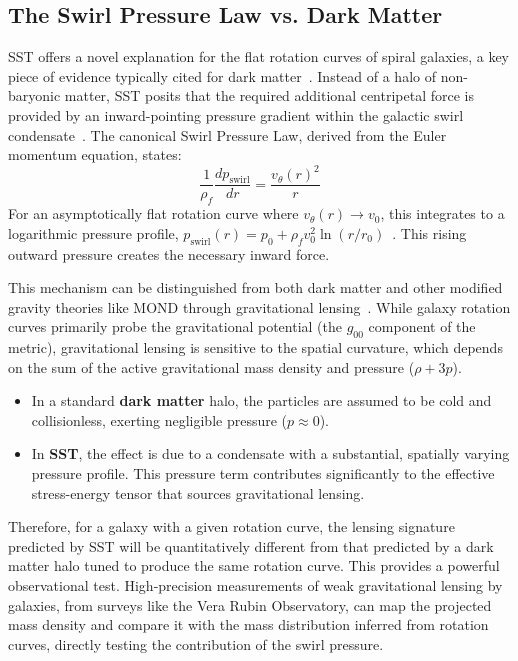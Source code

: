 \documentclass[11pt, a4paper]{article}
\begin{document}
    \subsection{The Swirl Pressure Law vs. Dark Matter}

        SST offers a novel explanation for the flat rotation curves of spiral galaxies, a key piece of evidence typically cited for dark matter~\cite{rotation_curve1, rotation_curve2}. Instead of a halo of non-baryonic matter, SST posits that the required additional centripetal force is provided by an inward-pointing pressure gradient within the galactic swirl condensate~\cite{sst_canon}. The canonical Swirl Pressure Law, derived from the Euler momentum equation, states:
        \begin{equation}
        \frac{1}{\rho_f}\frac{dp_{\text{swirl}}}{dr} = \frac{v_{\theta}(r)^2}{r}
        \end{equation}
        For an asymptotically flat rotation curve where $v_{\theta}(r) \to v_0$, this integrates to a logarithmic pressure profile, $p_{\text{swirl}}(r) = p_0 + \rho_f v_0^2 \ln(r/r_0)$~\cite{sst_canon}. This rising outward pressure creates the necessary inward force.

        This mechanism can be distinguished from both dark matter and other modified gravity theories like MOND through gravitational lensing~\cite{lensing_mond}. While galaxy rotation curves primarily probe the gravitational potential (the $g_{00}$ component of the metric), gravitational lensing is sensitive to the spatial curvature, which depends on the sum of the active gravitational mass density and pressure ($\rho + 3p$).
        \begin{itemize}
        \item In a standard \textbf{dark matter} halo, the particles are assumed to be cold and collisionless, exerting negligible pressure ($p \approx 0$).
        \item In \textbf{SST}, the effect is due to a condensate with a substantial, spatially varying pressure profile. This pressure term contributes significantly to the effective stress-energy tensor that sources gravitational lensing.
        \end{itemize}
        Therefore, for a galaxy with a given rotation curve, the lensing signature predicted by SST will be quantitatively different from that predicted by a dark matter halo tuned to produce the same rotation curve. This provides a powerful observational test. High-precision measurements of weak gravitational lensing by galaxies, from surveys like the Vera Rubin Observatory, can map the projected mass density and compare it with the mass distribution inferred from rotation curves, directly testing the contribution of the swirl pressure.
\end{document}
